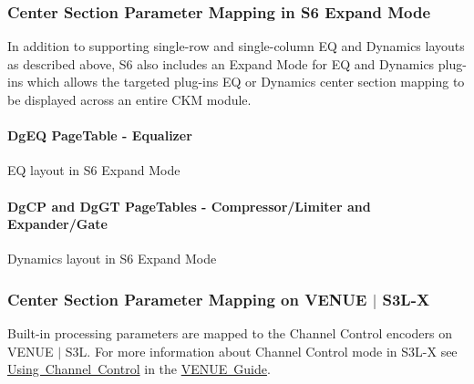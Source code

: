\hypertarget{a00833_aax_page_table_guide_04_avid_center_section_page_tables_venue_s6_mapping}{}\subsubsection{Center Section Parameter Mapping in S6 Expand Mode}\label{a00833_aax_page_table_guide_04_avid_center_section_page_tables_venue_s6_mapping}
 In addition to supporting single-\/row and single-\/column EQ and Dynamics layouts as described above, S6 also includes an Expand Mode for EQ and Dynamics plug-\/ins which allows the targeted plug-\/in\textquotesingle{}s EQ or Dynamics center section mapping to be displayed across an entire C\+KM module.

\hypertarget{a00833_aax_page_table_guide_04_avid_center_section_page_tables_venue_s6_mapping_DgEQ}{}\paragraph{\textquotesingle{}\+Dg\+E\+Q\textquotesingle{} Page\+Table -\/ Equalizer}\label{a00833_aax_page_table_guide_04_avid_center_section_page_tables_venue_s6_mapping_DgEQ}
   EQ layout in S6 Expand Mode

\hypertarget{a00833_aax_page_table_guide_04_avid_center_section_page_tables_venue_s6_mapping_DgCP_DgGT}{}\paragraph{\textquotesingle{}\+Dg\+C\+P\textquotesingle{} and \textquotesingle{}\+Dg\+G\+T\textquotesingle{} Page\+Tables -\/ Compressor/\+Limiter and Expander/\+Gate}\label{a00833_aax_page_table_guide_04_avid_center_section_page_tables_venue_s6_mapping_DgCP_DgGT}
   Dynamics layout in S6 Expand Mode

\hypertarget{a00833_aax_page_table_guide_04_avid_center_section_page_tables_venue_s3l_mapping}{}\subsubsection{Center Section Parameter Mapping on V\+E\+N\+U\+E $\vert$ S3\+L-\/X}\label{a00833_aax_page_table_guide_04_avid_center_section_page_tables_venue_s3l_mapping}
 Built-\/in processing parameters are mapped to the Channel Control encoders on V\+E\+N\+UE $\vert$ S3L. For more information about Channel Control mode in S3\+L-\/X see \mbox{\hyperlink{a00849_aax_venue_guide__systems__s3l__using_channel_control}{Using Channel Control}} in the \mbox{\hyperlink{a00849}{V\+E\+N\+UE Guide}}.

